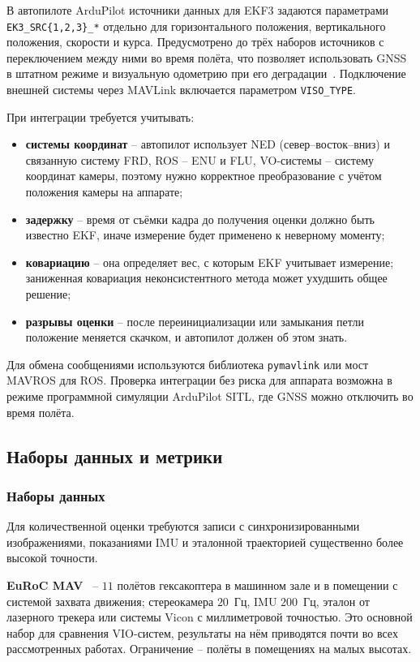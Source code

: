     В автопилоте ArduPilot источники данных для EKF3 задаются параметрами \texttt{EK3\_SRC\{1,2,3\}\_*} отдельно для горизонтального положения, вертикального положения, скорости и курса.
    Предусмотрено до трёх наборов источников с переключением между ними во время полёта, что позволяет использовать GNSS в штатном режиме и визуальную одометрию при его деградации~\cite{ardupilot_nongps, ardupilot_ekf_sources}.
    Подключение внешней системы через MAVLink включается параметром \texttt{VISO\_TYPE}.

    При интеграции требуется учитывать:
    \begin{itemize}
        \item \textbf{системы координат} -- автопилот использует NED (север--восток--вниз) и связанную систему FRD, ROS -- ENU и FLU, VO-системы -- систему координат камеры, поэтому нужно корректное преобразование с учётом положения камеры на аппарате;
        \item \textbf{задержку} -- время от съёмки кадра до получения оценки должно быть известно EKF, иначе измерение будет применено к неверному моменту;
        \item \textbf{ковариацию} -- она определяет вес, с которым EKF учитывает измерение; заниженная ковариация неконсистентного метода может ухудшить общее решение;
        \item \textbf{разрывы оценки} -- после переинициализации или замыкания петли положение меняется скачком, и автопилот должен об этом знать.
    \end{itemize}
    Для обмена сообщениями используются библиотека \texttt{pymavlink} или мост MAVROS для ROS.
    Проверка интеграции без риска для аппарата возможна в режиме программной симуляции ArduPilot SITL, где GNSS можно отключить во время полёта.

    \subsection{Наборы данных и метрики}

    \subsubsection{Наборы данных}
    Для количественной оценки требуются записи с синхронизированными изображениями, показаниями IMU и эталонной траекторией существенно более высокой точности.

    \textbf{EuRoC MAV}~\cite{euroc} -- $11$ полётов гексакоптера в машинном зале и в помещении с системой захвата движения; стереокамера $20$~Гц, IMU $200$~Гц, эталон от лазерного трекера или системы Vicon с миллиметровой точностью.
    Это основной набор для сравнения VIO-систем, результаты на нём приводятся почти во всех рассмотренных работах.
    Ограничение -- полёты в помещениях на малых высотах.

